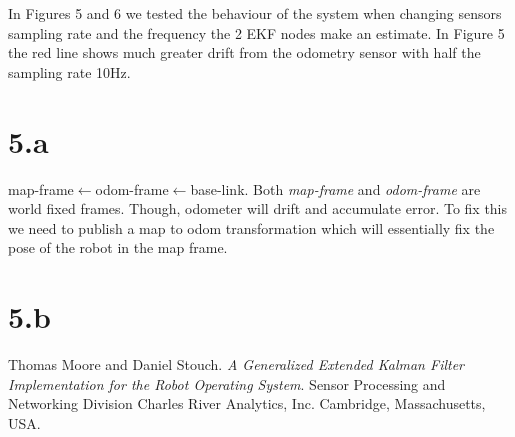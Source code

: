 \documentclass[10pt,a4paper,twocolumn]{article}
\begin{document}
In Figures 5 and 6 we tested the behaviour of the system when changing sensors sampling rate and the frequency the 2 EKF nodes make an estimate. In Figure 5 the red line shows much greater drift from the odometry sensor with half the sampling rate 10Hz.


\section{5.a}
map-frame$\leftarrow$odom-frame$\leftarrow$base-link. Both \textit{map-frame} and \textit{odom-frame} are world fixed frames. Though, odometer will drift and accumulate error. To fix this we need to publish a map to odom transformation which will essentially fix the pose of the robot in the map frame.

\section{5.b}

\begin{thebibliography}{9}
	Thomas Moore and Daniel Stouch. 
	\textit{A Generalized Extended Kalman Filter Implementation for the Robot Operating System}. 
	Sensor Processing and Networking Division Charles River Analytics, Inc. Cambridge, Massachusetts, USA.	
	
\end{thebibliography}


	
\end{document}
